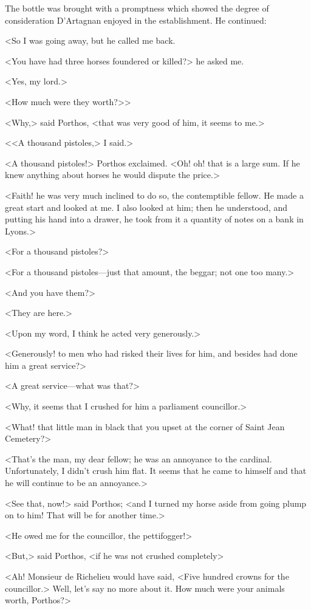 The bottle was brought with a promptness which showed the degree of consideration D'Artagnan enjoyed in the establishment. He continued:

<So I was going away, but he called me back.

<You have had three horses foundered or killed?> he asked me.

<Yes, my lord.>

<How much were they worth?>>

<Why,> said Porthos, <that was very good of him, it seems to me.>

<<A thousand pistoles,> I said.>

<A thousand pistoles!> Porthos exclaimed. <Oh! oh! that is a large sum. If he knew anything about horses he would dispute the price.>

<Faith! he was very much inclined to do so, the contemptible fellow. He made a great start and looked at me. I also looked at him; then he understood, and putting his hand into a drawer, he took from it a quantity of notes on a bank in Lyons.>

<For a thousand pistoles?>

<For a thousand pistoles—just that amount, the beggar; not one too many.>

<And you have them?>

<They are here.>

<Upon my word, I think he acted very generously.>

<Generously! to men who had risked their lives for him, and besides had done him a great service?>

<A great service—what was that?>

<Why, it seems that I crushed for him a parliament councillor.>

<What! that little man in black that you upset at the corner of Saint Jean Cemetery?>

<That's the man, my dear fellow; he was an annoyance to the cardinal. Unfortunately, I didn't crush him flat. It seems that he came to himself and that he will continue to be an annoyance.>

<See that, now!> said Porthos; <and I turned my horse aside from going plump on to him! That will be for another time.>

<He owed me for the councillor, the pettifogger!>

<But,> said Porthos, <if he was not crushed completely\longdash>

<Ah! Monsieur de Richelieu would have said, <Five hundred crowns for the councillor.> Well, let's say no more about it. How much were your animals worth, Porthos?>

